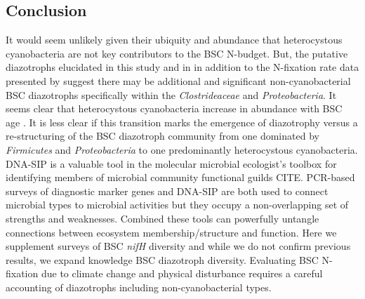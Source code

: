 \subsection{Conclusion}
It would seem unlikely given their ubiquity and abundance that heterocystous
cyanobacteria are not key contributors to the BSC N-budget. But, the putative
diazotrophs elucidated in this study and in \citet{Steppe_1996} in addition to
the N-fixation rate data presented by \citep{15643930} suggest there may be
additional and significant non-cyanobacterial BSC diazotrophs specifically
within the \textit{Clostrideaceae} and \textit{Proteobacteria}. It seems clear
that heterocystous cyanobacteria increase in abundance with BSC age
\citep{14766579}. It is less clear if this transition marks the emergence of
diazotrophy versus a re-structuring of the BSC diazotroph community from one
dominated by \textit{Firmicutes} and \textit{Proteobacteria} to one
predominantly heterocystous cyanobacteria. DNA-SIP is a valuable tool in the
molecular microbial ecologist's toolbox for identifying members of microbial
community functional guilds CITE. PCR-based surveys of diagnostic marker genes
and DNA-SIP are both used to connect microbial types to microbial activities
but they occupy a non-overlapping set of strengths and weaknesses. Combined
these tools can powerfully untangle connections between ecosystem
membership/structure and function. Here we supplement surveys of BSC
\textit{nifH} diversity and while we do not confirm previous results, we expand
knowledge BSC diazotroph diversity. Evaluating BSC N-fixation due to climate
change and physical disturbance requires a careful accounting of diazotrophs
including non-cyanobacterial types. 
